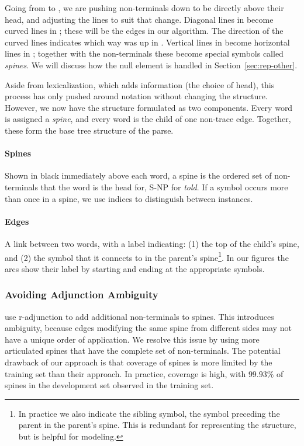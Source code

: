 Going from  to , we are pushing non-terminals down to be directly above their head, and adjusting the lines to suit that change.
Diagonal lines in  become curved lines in ; these will be the edges in our algorithm.
The direction of the curved lines indicates which way was up in .
Vertical lines in  become horizontal lines in ; together with the non-terminals these become special symbols called \emph{spines}.
We will discuss how the null element is handled in Section~\ref{sec:rep-other}.

Aside from lexicalization, which adds information (the choice of head), this process has only pushed around notation without changing the structure.
However, we now have the structure formulated as two components.
Every word is assigned a \emph{spine}, and every word is the child of one non-trace edge.
Together, these form the base tree structure of the parse.

\paragraph{Spines}
Shown in black immediately above each word, a spine is the ordered set of non-terminals that the word is the head for, \myeg S-NP for \emph{told}.
If a symbol occurs more than once in a spine, we use indices to distinguish between instances.

\paragraph{Edges}
A link between two words, with a label indicating: (1) the top of the child's spine, and (2) the symbol that it connects to in the parent's spine\footnote{
In practice we also indicate the sibling symbol, \myie the symbol preceding the parent in the parent's spine.
This is redundant for representing the structure, but is helpful for modeling.
}.
In our figures the arcs show their label by starting and ending at the appropriate symbols.

\subsubsection{Avoiding Adjunction Ambiguity}

\textcite{cck} use r-adjunction to add additional non-terminals to spines.
This introduces ambiguity, because edges modifying the same spine from different sides may not have a unique order of application.
We resolve this issue by using more articulated spines that have the complete set of non-terminals.
The potential drawback of our approach is that coverage of spines is more limited by the training set than their approach.
In practice, coverage is high, with $99.93\%$ of spines in the development set observed in the training set.

